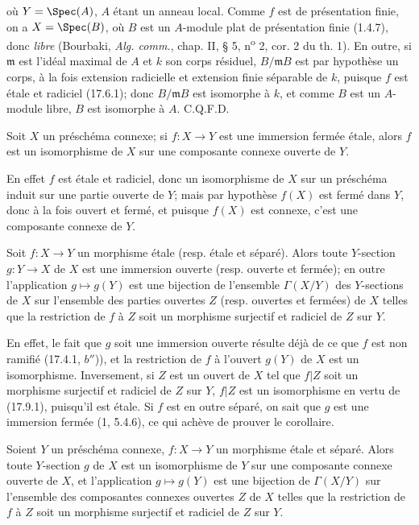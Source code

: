 
où $Y=\Spec(A)$, $A$ étant un anneau local. Comme $f$ est de présentation finie, on a $X=\Spec(B)$, où $B$ est un $A$-module plat de présentation finie (1.4.7), donc \emph{libre} (Bourbaki, \emph{Alg. comm.}, chap. II, § 5, n\textsuperscript{o} 2, cor. 2 du th. 1). En outre, si $\mathfrak m$ est l'idéal maximal de $A$ et $k$ son corps résiduel, $B/\mathfrak mB$ est par hypothèse un corps, à la fois extension radicielle et extension finie séparable de $k$, puisque $f$ est étale et radiciel (17.6.1); donc $B/\mathfrak mB$ est isomorphe à $k$, et comme $B$ est un $A$-module libre, $B$ est isomorphe à $A$. C.Q.F.D.

\begin{corollary}[17.9.2]
\label{IV.17.9.2}
Soit $X$ un préschéma connexe; si $f:X\to Y$ est une immersion fermée étale, alors $f$ est un isomorphisme de $X$ sur une composante connexe ouverte de $Y$.
\end{corollary}

En effet $f$ est étale et radiciel, donc un isomorphisme de $X$ sur un préschéma induit sur une partie ouverte de $Y$; mais par hypothèse $f(X)$ est fermé dans $Y$, donc à la fois ouvert et fermé, et puisque $f(X)$ est connexe, c'est une composante connexe de $Y$.

\begin{corollary}[17.9.3]
\label{IV.17.9.3}
Soit $f:X\to Y$ un morphisme étale (resp. étale et séparé). Alors toute $Y$-section $g:Y\to X$ de $X$ est une immersion ouverte (resp. ouverte et fermée); en outre l'application $g\mapsto g(Y)$ est une bijection de l'ensemble $\Gamma(X/Y)$ des $Y$-sections de $X$ sur l'ensemble des parties ouvertes $Z$ (resp. ouvertes et fermées) de $X$ telles que la restriction de $f$ à $Z$ soit un morphisme surjectif et radiciel de $Z$ sur $Y$.
\end{corollary}

En effet, le fait que $g$ soit une immersion ouverte résulte déjà de ce que $f$ est non ramifié (17.4.1, $b''$)), et la restriction de $f$ à l'ouvert $g(Y)$ de $X$ est un isomorphisme. Inversement, si $Z$ est un ouvert de $X$ tel que $f|Z$ soit un morphisme surjectif et radiciel de $Z$ sur $Y$, $f|Z$ est un isomorphisme en vertu de (17.9.1), puisqu'il est étale. Si $f$ est en outre séparé, on sait que $g$ est une immersion fermée (1, 5.4.6), ce qui achève de prouver le corollaire.

\begin{corollary}[17.9.4]
\label{IV.17.9.4}
Soient $Y$ un préschéma connexe, $f:X\to Y$ un morphisme étale et séparé. Alors toute $Y$-section $g$ de $X$ est un isomorphisme de $Y$ sur une composante connexe ouverte de $X$, et l'application $g\mapsto g(Y)$ est une bijection de $\Gamma(X/Y)$ sur l'ensemble des composantes connexes ouvertes $Z$ de $X$ telles que la restriction de $f$ à $Z$ soit un morphisme surjectif et radiciel de $Z$ sur $Y$.
\end{corollary}

